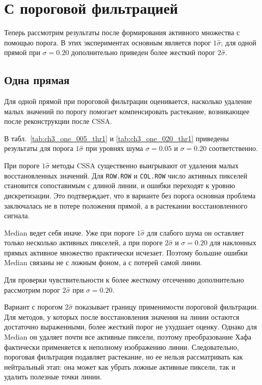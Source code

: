 \section{С пороговой фильтрацией}

Теперь рассмотрим результаты после формирования активного множества с помощью
порога. В этих экспериментах основным является порог $1\hat\sigma$; для одной
прямой при $\sigma=0.20$ дополнительно приведен более жесткий порог
$2\hat\sigma$.

\subsection{Одна прямая}

Для одной прямой при пороговой фильтрации оценивается, насколько удаление малых
значений по порогу помогает компенсировать растекание, возникающее после
реконструкции после CSSA.

В табл.~\ref{tab:ch3_one_005_thr1} и \ref{tab:ch3_one_020_thr1} приведены
результаты для порога $1\hat\sigma$ при уровнях шума $\sigma=0.05$ и
$\sigma=0.20$ соответственно.





При пороге $1\hat\sigma$ методы CSSA существенно выигрывают от удаления малых
восстановленных значений. Для \texttt{ROW.ROW} и \texttt{COL.ROW} число
активных пикселей становится сопоставимым с длиной линии, и ошибки переходят
к уровню дискретизации. Это подтверждает, что в варианте без порога основная
проблема заключалась не в потере положения прямой, а в растекании
восстановленного сигнала.

Median ведет себя иначе. Уже при пороге $1\hat\sigma$ для слабого шума он
оставляет только несколько активных пикселей, а при пороге $2\hat\sigma$ и
$\sigma=0.20$ для наклонных прямых активное множество практически исчезает.
Поэтому большие ошибки Median связаны не с ложным фоном, а с потерей самой
линии.

Для проверки чувствительности к более жесткому отсечению дополнительно
рассмотрим порог $2\hat\sigma$ при $\sigma=0.20$.



Вариант с порогом $2\hat\sigma$ показывает границу применимости пороговой
фильтрации. Для методов, у которых после восстановления значения на линии
остаются достаточно выраженными, более жесткий порог не ухудшает оценку.
Однако для Median он удаляет почти все активные пиксели, поэтому
преобразование Хафа фактически применяется к неполному изображению линии.
Следовательно, пороговая фильтрация подавляет растекание, но ее нельзя
рассматривать как нейтральный этап: она может как убрать ложные активные
пиксели, так и удалить полезные точки линии.


